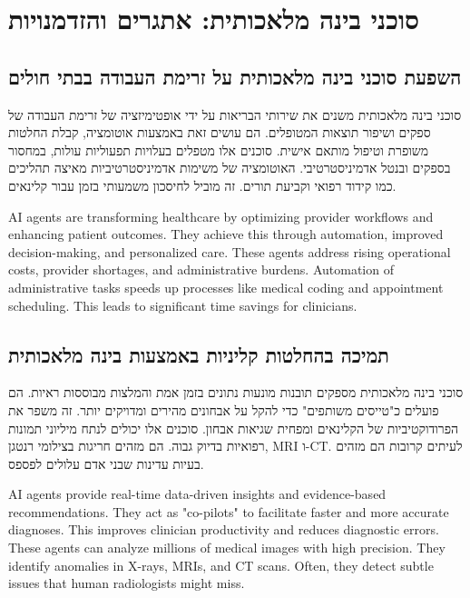 \documentclass[12pt,a4paper]{article}
\newenvironment{hebrewblock}{%
  \begin{tcolorbox}[enhanced,breakable,parbox=false,
    colback=blue!4!white,colframe=blue!28!white,
    left=8pt,right=8pt,top=6pt,bottom=6pt,arc=2pt,boxrule=0.5pt]%
  \hebrewfont\begin{hebrew}%
}{%
  \end{hebrew}\end{tcolorbox}\vspace{3pt}%
}
\newenvironment{englishblock}{%
  \begin{tcolorbox}[enhanced,breakable,parbox=false,
    colback=gray!5!white,colframe=gray!28!white,
    left=8pt,right=8pt,top=6pt,bottom=6pt,arc=2pt,boxrule=0.5pt]%
  \normalfont\setLR%
}{%
  \end{tcolorbox}\vspace{3pt}%
}
\begin{document}
\section{\texthebrew{סוכני בינה מלאכותית: אתגרים והזדמנויות}}
\label{sec:hebrew_bidi}
\subsection{\texthebrew{השפעת סוכני בינה מלאכותית על זרימת העבודה בבתי חולים}}
\label{subsec:hebrew_workflow}
\begin{hebrewblock}
סוכני בינה מלאכותית משנים את שירותי הבריאות על ידי אופטימיזציה של זרימת העבודה של ספקים ושיפור תוצאות המטופלים. הם עושים זאת באמצעות אוטומציה, קבלת החלטות משופרת וטיפול מותאם אישית. סוכנים אלו מטפלים בעלויות תפעוליות עולות, במחסור בספקים ובנטל אדמיניסטרטיבי. האוטומציה של משימות אדמיניסטרטיביות מאיצה תהליכים כמו קידוד רפואי וקביעת תורים. זה מוביל לחיסכון משמעותי בזמן עבור קלינאים.
\end{hebrewblock}
\begin{englishblock}
AI agents are transforming healthcare by optimizing provider workflows and enhancing patient outcomes. They achieve this through automation, improved decision-making, and personalized care. These agents address rising operational costs, provider shortages, and administrative burdens. Automation of administrative tasks speeds up processes like medical coding and appointment scheduling. This leads to significant time savings for clinicians.
\end{englishblock}

\subsection{\texthebrew{תמיכה בהחלטות קליניות באמצעות בינה מלאכותית}}
\label{subsec:hebrew_clinical_support}
\begin{hebrewblock}
סוכני בינה מלאכותית מספקים תובנות מונעות נתונים בזמן אמת והמלצות מבוססות ראיות. הם פועלים כ"טייסים משותפים" כדי להקל על אבחונים מהירים ומדויקים יותר. זה משפר את הפרודוקטיביות של הקלינאים ומפחית שגיאות אבחון. סוכנים אלו יכולים לנתח מיליוני תמונות רפואיות בדיוק גבוה. הם מזהים חריגות בצילומי רנטגן, MRI ו-CT. לעיתים קרובות הם מזהים בעיות עדינות שבני אדם עלולים לפספס.
\end{hebrewblock}
\begin{englishblock}
AI agents provide real-time data-driven insights and evidence-based recommendations. They act as "co-pilots" to facilitate faster and more accurate diagnoses. This improves clinician productivity and reduces diagnostic errors. These agents can analyze millions of medical images with high precision. They identify anomalies in X-rays, MRIs, and CT scans. Often, they detect subtle issues that human radiologists might miss.
\end{englishblock}
\end{document}
